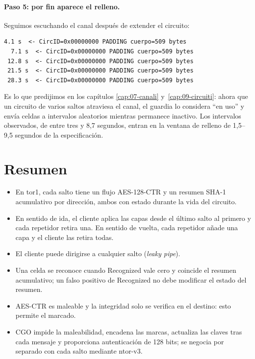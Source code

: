\paragraph{Paso 5: por fin aparece el relleno.} Seguimos escuchando el canal después de extender el circuito:

\begin{lstlisting}[numbers=none]
  4.1 s  <- CircID=0x00000000 PADDING cuerpo=509 bytes
  7.1 s  <- CircID=0x00000000 PADDING cuerpo=509 bytes
 12.8 s  <- CircID=0x00000000 PADDING cuerpo=509 bytes
 21.5 s  <- CircID=0x00000000 PADDING cuerpo=509 bytes
 28.3 s  <- CircID=0x00000000 PADDING cuerpo=509 bytes
\end{lstlisting}

Es lo que predijimos en los capítulos \ref{cap:07-canali} y~\ref{cap:09-circuiti}: ahora que un circuito de varios saltos atraviesa el canal, el guardia lo considera \enquote{en uso} y envía celdas  a intervalos aleatorios mientras permanece inactivo. Los intervalos observados, de entre tres y 8,7 segundos, entran en la ventana de relleno de 1,5--9,5 segundos de la especificación.

\section*{Resumen}
\begin{itemize}
  \item En tor1, cada salto tiene un flujo AES-128-CTR y un resumen SHA-1 acumulativo por dirección, ambos con estado durante la vida del circuito.
  \item En sentido de ida, el cliente aplica las capas desde el último salto al primero y cada repetidor retira una. En sentido de vuelta, cada repetidor añade una capa y el cliente las retira todas.
  \item El cliente puede dirigirse a cualquier salto (\emph{leaky pipe}).
  \item Una celda se reconoce cuando Recognized vale cero y coincide el resumen acumulativo; un falso positivo de Recognized no debe modificar el estado del resumen.
  \item AES-CTR es maleable y la integridad solo se verifica en el destino: esto permite el marcado.
  \item CGO impide la maleabilidad, encadena las marcas, actualiza las claves tras cada mensaje y proporciona autenticación de 128 bits; se negocia por separado con cada salto mediante ntor-v3.
\end{itemize}

